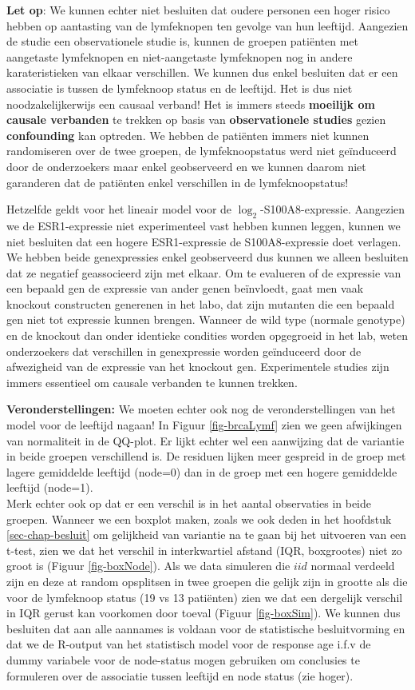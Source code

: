 \documentclass[
  dutch,
  letterpaper,
  12pt]{book}
\theoremstyle{definition}
\theoremstyle{definition}
\theoremstyle{definition}
\theoremstyle{remark}
\begin{document}
\textbf{Let op}: We kunnen echter niet besluiten dat oudere personen een
hoger risico hebben op aantasting van de lymfeknopen ten gevolge van hun
leeftijd. Aangezien de studie een observationele studie is, kunnen de
groepen patiënten met aangetaste lymfeknopen en niet-aangetaste
lymfeknopen nog in andere karateristieken van elkaar verschillen. We
kunnen dus enkel besluiten dat er een associatie is tussen de lymfeknoop
status en de leeftijd. Het is dus niet noodzakelijkerwijs een causaal
verband! Het is immers steeds \textbf{moeilijk om causale verbanden} te
trekken op basis van \textbf{observationele studies} gezien
\textbf{confounding} kan optreden. We hebben de patiënten immers niet
kunnen randomiseren over de twee groepen, de lymfeknoopstatus werd niet
geïnduceerd door de onderzoekers maar enkel geobserveerd en we kunnen
daarom niet garanderen dat de patiënten enkel verschillen in de
lymfeknoopstatus!

Hetzelfde geldt voor het lineair model voor de
\(\log_2\)-S100A8-expressie. Aangezien we de ESR1-expressie niet
experimenteel vast hebben kunnen leggen, kunnen we niet besluiten dat
een hogere ESR1-expressie de S100A8-expressie doet verlagen. We hebben
beide genexpressies enkel geobserveerd dus kunnen we alleen besluiten
dat ze negatief geassocieerd zijn met elkaar. Om te evalueren of de
expressie van een bepaald gen de expressie van ander genen beïnvloedt,
gaat men vaak knockout constructen generenen in het labo, dat zijn
mutanten die een bepaald gen niet tot expressie kunnen brengen. Wanneer
de wild type (normale genotype) en de knockout dan onder identieke
condities worden opgegroeid in het lab, weten onderzoekers dat
verschillen in genexpressie worden geïnduceerd door de afwezigheid van
de expressie van het knockout gen. Experimentele studies zijn immers
essentieel om causale verbanden te kunnen trekken.

\textbf{Veronderstellingen:} We moeten echter ook nog de
veronderstellingen van het model voor de leeftijd nagaan! In Figuur
\ref{fig-brcaLymf} zien we geen afwijkingen van normaliteit in de
QQ-plot. Er lijkt echter wel een aanwijzing dat de variantie in beide
groepen verschillend is. De residuen lijken meer gespreid in de groep
met lagere gemiddelde leeftijd (node=0) dan in de groep met een hogere
gemiddelde leeftijd (node=1).\\
Merk echter ook op dat er een verschil is in het aantal observaties in
beide groepen. Wanneer we een boxplot maken, zoals we ook deden in het
hoofdstuk \ref{sec-chap-besluit} om gelijkheid van variantie na te gaan
bij het uitvoeren van een t-test, zien we dat het verschil in
interkwartiel afstand (IQR, boxgrootes) niet zo groot is (Figuur
\ref{fig-boxNode}). Als we data simuleren die \(iid\) normaal verdeeld
zijn en deze at random opsplitsen in twee groepen die gelijk zijn in
grootte als die voor de lymfeknoop status (19 vs 13 patiënten) zien we
dat een dergelijk verschil in IQR gerust kan voorkomen door toeval
(Figuur \ref{fig-boxSim}). We kunnen dus besluiten dat aan alle aannames
is voldaan voor de statistische besluitvorming en dat we de R-output van
het statistisch model voor de response age i.f.v de dummy variabele voor
de node-status mogen gebruiken om conclusies te formuleren over de
associatie tussen leeftijd en node status (zie hoger).
\end{document}

